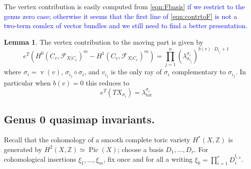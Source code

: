 \documentclass[11pt]{amsart}
\newcommand{\F}{\mathcal F}
\newcommand{\Pic}{\operatorname{Pic}}
\newcommand{\ZZ}{\mathbb{Z}}
\newcommand{\vv}{\operatorname{v}}
\theoremstyle{definition}
\newtheorem{lem}[thm]{Lemma}
\theoremstyle{definition}
\begin{document}
The vertex contribution is easily computed from \eqref{eqn:Fbasis} \textcolor{blue}{if we restrict to the genus zero case; otherwise it seems that the first line of \eqref{eqn:contrtoF} is not a two-term comlex of vector bundles and we still need to find a better presentation.}

\begin{lem}
 The vertex contribution to the moving part is given by
 \[
  e^T(H^0(C_v,\F_{X|C_v})^m-H^1(C_v,\F_{X|C_v})^m)=\prod_{j=1}^n(\lambda^{\sigma_i}_{\sigma_{i_j}})^{b(v)\cdot D_{i_j}+1}
 \]
\noindent where $\sigma_i=\vv(v)$, $\sigma_{i_j}\diamond\sigma_i$, and $v_{i_j}$ is the only ray of $\sigma_i$ complementary to $\sigma_{i_j}$. In particular when $b(v)=0$ this reduces to
\[
 e^T(TX_{\sigma_i})=\lambda^{\sigma_i}_{\text{tot}}
\]

\end{lem}

\subsection{Genus 0 quasimap invariants.} Recall that the cohomology of a smooth complete toric variety $H^*(X,\ZZ)$ is generated by $H^2(X,\ZZ)\simeq\Pic(X)$; choose a basis $D_1,\ldots,D_r$. For cohomological insertions $\xi_1,\ldots,\xi_m$, fix once and for all a writing $\xi_k=\prod_{i=1}^r D_i^{l_{i,k}}$.
\end{document}

